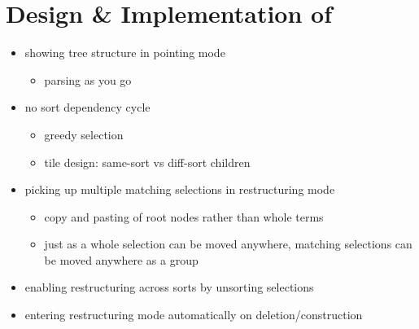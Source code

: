 \section{Design \& Implementation of \tylr}\label{sec:implementation}

\begin{itemize}
  \item showing tree structure in pointing mode
  \begin{itemize}
    \item parsing as you go
  \end{itemize}
  \item no sort dependency cycle
  \begin{itemize}
    \item greedy selection
    \item tile design: same-sort vs diff-sort children
  \end{itemize}
  \item picking up multiple matching selections in restructuring mode
  \begin{itemize}
    \item copy and pasting of root nodes rather than whole terms
    \item just as a whole selection can be moved anywhere, matching selections
      can be moved anywhere as a group
  \end{itemize}
  \item enabling restructuring across sorts by unsorting selections
  \item entering restructuring mode automatically on deletion/construction
\end{itemize}